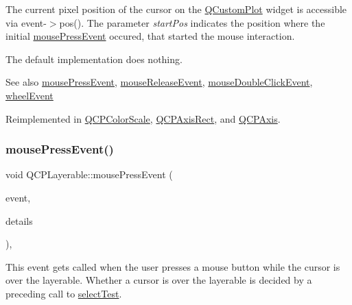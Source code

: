 The current pixel position of the cursor on the \hyperlink{class_q_custom_plot}{Q\+Custom\+Plot} widget is accessible via {\ttfamily event-\/$>$pos()}. The parameter {\itshape start\+Pos} indicates the position where the initial \hyperlink{class_q_c_p_layerable_af6567604818db90f4fd52822f8bc8376}{mouse\+Press\+Event} occured, that started the mouse interaction.

The default implementation does nothing.

\begin{DoxySeeAlso}{See also}
\hyperlink{class_q_c_p_layerable_af6567604818db90f4fd52822f8bc8376}{mouse\+Press\+Event}, \hyperlink{class_q_c_p_layerable_aa0d79b005686f668622bbe66ac03ba2c}{mouse\+Release\+Event}, \hyperlink{class_q_c_p_layerable_a4171e2e823aca242dd0279f00ed2de81}{mouse\+Double\+Click\+Event}, \hyperlink{class_q_c_p_layerable_a47dfd7b8fd99c08ca54e09c362b6f022}{wheel\+Event} 
\end{DoxySeeAlso}


Reimplemented in \hyperlink{class_q_c_p_color_scale_a3b2bd79725aefaf2630fc76e90939442}{Q\+C\+P\+Color\+Scale}, \hyperlink{class_q_c_p_axis_rect_a9cd27ad8c5cfb49aefd9dbb30def4beb}{Q\+C\+P\+Axis\+Rect}, and \hyperlink{class_q_c_p_axis_a2a89a13440eec099fc2327c2672be0cd}{Q\+C\+P\+Axis}.

\mbox{\label{class_q_c_p_layerable_af6567604818db90f4fd52822f8bc8376}} 
\subsubsection{\texorpdfstring{mouse\+Press\+Event()}{mousePressEvent()}}
{\footnotesize\ttfamily void Q\+C\+P\+Layerable\+::mouse\+Press\+Event (\begin{DoxyParamCaption}\item[{Q\+Mouse\+Event $\ast$}]{event,  }\item[{const Q\+Variant \&}]{details }\end{DoxyParamCaption})\hspace{0.3cm}{\ttfamily [protected]}, {\ttfamily [virtual]}}

This event gets called when the user presses a mouse button while the cursor is over the layerable. Whether a cursor is over the layerable is decided by a preceding call to \hyperlink{class_q_c_p_layerable_a04db8351fefd44cfdb77958e75c6288e}{select\+Test}.


